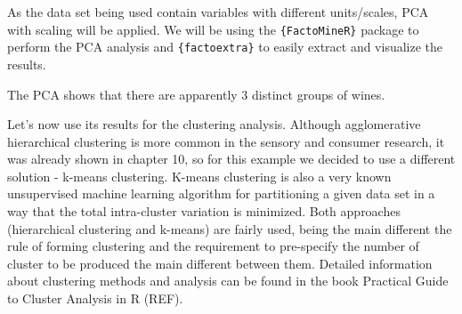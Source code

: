 \documentclass[
]{book}
\newenvironment{Shaded}{\begin{snugshade}}{\end{snugshade}}
\newcommand{\AttributeTok}[1]{\textcolor[rgb]{0.77,0.63,0.00}{#1}}
\newcommand{\ConstantTok}[1]{\textcolor[rgb]{0.00,0.00,0.00}{#1}}
\newcommand{\DecValTok}[1]{\textcolor[rgb]{0.00,0.00,0.81}{#1}}
\newcommand{\FunctionTok}[1]{\textcolor[rgb]{0.00,0.00,0.00}{#1}}
\newcommand{\NormalTok}[1]{#1}
\newcommand{\OtherTok}[1]{\textcolor[rgb]{0.56,0.35,0.01}{#1}}
\newcommand{\SpecialCharTok}[1]{\textcolor[rgb]{0.00,0.00,0.00}{#1}}
\newcommand{\StringTok}[1]{\textcolor[rgb]{0.31,0.60,0.02}{#1}}
\begin{document}
As the data set being used contain variables with different units/scales, PCA with scaling will be applied. We will be using the \texttt{\{FactoMineR\}} package to perform the PCA analysis and \texttt{\{factoextra\}} to easily extract and visualize the results.

\begin{Shaded}
\end{Shaded}

The PCA shows that there are apparently 3 distinct groups of wines.

Let's now use its results for the clustering analysis. Although agglomerative hierarchical clustering is more common in the sensory and consumer research, it was already shown in chapter 10, so for this example we decided to use a different solution - k-means clustering. K-means clustering is also a very known unsupervised machine learning algorithm for partitioning a given data set in a way that the total intra-cluster variation is minimized. Both approaches (hierarchical clustering and k-means) are fairly used, being the main different the rule of forming clustering and the requirement to pre-specify the number of cluster to be produced the main different between them. Detailed information about clustering methods and analysis can be found in the book Practical Guide to Cluster Analysis in R (REF).
\end{document}
